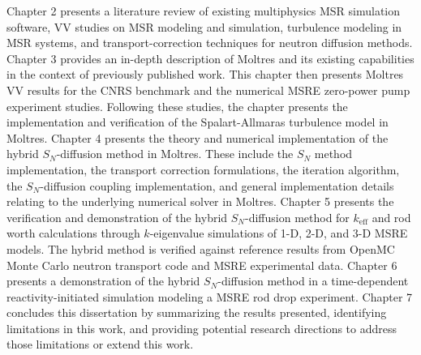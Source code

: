Chapter 2 presents a literature review of existing multiphysics \gls{MSR} simulation software,
\gls{VV} studies on \gls{MSR} modeling and simulation, turbulence modeling in \gls{MSR} systems,
and transport-correction techniques for neutron diffusion methods.
Chapter 3 provides an in-depth description of Moltres and its existing capabilities in the context
of previously published work. This chapter then presents Moltres \gls{VV} results for the CNRS
benchmark and the numerical \gls{MSRE} zero-power pump experiment studies. Following these studies,
the chapter presents the implementation and verification of the Spalart-Allmaras turbulence model
in Moltres.
Chapter 4 presents the theory and numerical implementation of the hybrid
$S_N$-diffusion method in Moltres. These include the $S_N$ method implementation, the transport
correction formulations, the iteration algorithm, the $S_N$-diffusion coupling implementation, and
general implementation details relating to the underlying numerical solver in Moltres.
Chapter 5 presents the verification and demonstration of the hybrid $S_N$-diffusion method for
$k_\text{eff}$ and rod worth calculations through
$k$-eigenvalue simulations of 1-D, 2-D, and 3-D \gls{MSRE} models. The hybrid method is verified
against reference results from OpenMC Monte Carlo neutron transport code and \gls{MSRE}
experimental data.
Chapter 6 presents a demonstration of the hybrid $S_N$-diffusion method in a time-dependent
reactivity-initiated simulation modeling a \gls{MSRE} rod drop experiment.
Chapter 7 concludes this dissertation by summarizing the results presented, identifying limitations
in this work, and providing potential research directions to address those limitations or extend
this work.
